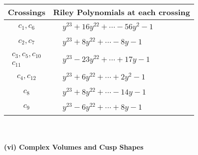\documentclass[1p]{elsarticle_modified}
\theoremstyle{definition}
\begin{document}
\begin{tabular}{m{50pt}|m{274pt}}
Crossings & \hspace{64pt}Riley Polynomials at each crossing \\
\hline $$\begin{aligned}c_{1},c_{6}\end{aligned}$$&$\begin{aligned}
&y^{23}+16 y^{22}+\cdots-56 y^2-1
\end{aligned}$\\
\hline $$\begin{aligned}c_{2},c_{7}\end{aligned}$$&$\begin{aligned}
&y^{23}+8 y^{22}+\cdots-8 y-1
\end{aligned}$\\
\hline $$\begin{aligned}c_{3},c_{5},c_{10}\\c_{11}\end{aligned}$$&$\begin{aligned}
&y^{23}-23 y^{22}+\cdots+17 y-1
\end{aligned}$\\
\hline $$\begin{aligned}c_{4},c_{12}\end{aligned}$$&$\begin{aligned}
&y^{23}+6 y^{22}+\cdots+2 y^2-1
\end{aligned}$\\
\hline $$\begin{aligned}c_{8}\end{aligned}$$&$\begin{aligned}
&y^{23}+8 y^{22}+\cdots-14 y-1
\end{aligned}$\\
\hline $$\begin{aligned}c_{9}\end{aligned}$$&$\begin{aligned}
&y^{23}-6 y^{22}+\cdots+8 y-1
\end{aligned}$\\
\hline
\end{tabular}\\~\\
\newpage\flushleft \textbf{(vi) Complex Volumes and Cusp Shapes}
\end{document}

